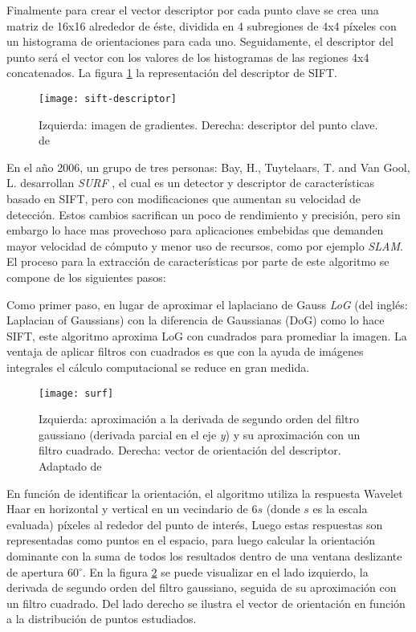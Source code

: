 Finalmente para crear el vector descriptor por cada punto clave se crea una matriz de 16x16 alrededor de éste, dividida en 4 subregiones de 4x4 píxeles con un histograma de orientaciones para cada uno. Seguidamente, el descriptor del punto será el vector con los valores de los histogramas de las regiones 4x4 concatenados. La figura \ref{imagen:descriptor} la representación del descriptor de SIFT.

\begin{figure}[H]
	\centering
	\texttt{[image: sift-descriptor]}
	\caption[Descriptor SIFT]{Izquierda: imagen de gradientes. Derecha: descriptor del punto clave. de \cite{sift}}
	\label{imagen:descriptor}
\end{figure}


En el año 2006, un grupo de tres personas: Bay, H., Tuytelaars, T. and Van Gool, L. desarrollan \textit{SURF} \cite{surf}, el cual es un detector y descriptor de características basado en SIFT, pero con modificaciones que aumentan su velocidad de detección. Estos cambios sacrifican un poco de rendimiento y precisión, pero sin embargo lo hace mas provechoso para aplicaciones embebidas que demanden mayor velocidad de cómputo y menor uso de recursos, como por ejemplo \textit{SLAM}. El proceso para la extracción de características por parte de este algoritmo se compone de los siguientes pasos:

Como primer paso, en lugar de aproximar el laplaciano de Gauss \textit{LoG} (del inglés: Laplacian of Gaussians) con la diferencia de Gaussianas (DoG) como lo hace SIFT, este algoritmo aproxima LoG con cuadrados para promediar la imagen. La ventaja de aplicar filtros con cuadrados es que con la ayuda de imágenes integrales el cálculo computacional se reduce en gran medida.

\begin{figure}[H]
	\centering
	\texttt{[image: surf]}
	\caption[Detector y descriptor SURF]{Izquierda: aproximación a la derivada de segundo orden del filtro gaussiano (derivada parcial en el eje \textit{y}) y su aproximación con un filtro cuadrado. Derecha: vector de orientación del descriptor. Adaptado de \cite{surf}}
	\label{imagen:surf}
\end{figure}

En función de identificar la orientación, el algoritmo utiliza la respuesta Wavelet Haar en horizontal y vertical en un vecindario de 6$s$ (donde $s$ es la escala evaluada) píxeles al rededor del punto de interés, Luego estas respuestas son representadas como puntos en el espacio, para luego calcular la orientación dominante con la suma de todos los resultados dentro de una ventana deslizante de apertura 60$^\circ$. En la figura \ref{imagen:surf} se puede visualizar en el lado izquierdo, la derivada de segundo orden del filtro gaussiano, seguida de su aproximación con un filtro cuadrado. Del lado derecho se ilustra el vector de orientación en función a la distribución de puntos estudiados.

